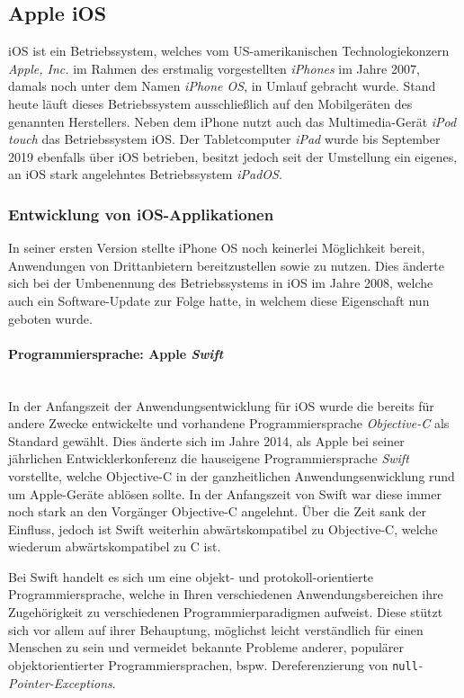

\subsection{Apple iOS} \label{chap:apple_ios}

iOS ist ein Betriebssystem, welches vom US-amerikanischen Technologiekonzern \textit{Apple, Inc.} im Rahmen des erstmalig vorgestellten \textit{iPhones} im Jahre 2007, damals noch unter dem Namen \textit{iPhone OS}, in Umlauf gebracht wurde. Stand heute läuft dieses Betriebssystem ausschließlich auf den Mobilgeräten des genannten Herstellers. Neben dem iPhone nutzt auch das Multimedia-Gerät \textit{iPod touch} das Betriebssystem iOS. Der Tabletcomputer \textit{iPad} wurde bis September 2019 ebenfalls über iOS betrieben, besitzt jedoch seit der Umstellung ein eigenes, an iOS stark angelehntes Betriebssystem \textit{iPadOS}.

\subsubsection{Entwicklung von iOS-Applikationen}

In seiner ersten Version stellte iPhone OS noch keinerlei Möglichkeit bereit, Anwendungen von Drittanbietern bereitzustellen sowie zu nutzen. Dies änderte sich bei der Umbenennung des Betriebssystems in iOS im Jahre 2008, welche auch ein Software-Update zur Folge hatte, in welchem diese Eigenschaft nun geboten wurde.

\paragraph{Programmiersprache: Apple \textit{Swift}}\mbox{}\\
In der Anfangszeit der Anwendungsentwicklung für iOS wurde die bereits für andere Zwecke entwickelte und vorhandene Programmiersprache \textit{Objective-C} als Standard gewählt. Dies änderte sich im Jahre 2014, als Apple bei seiner jährlichen Entwicklerkonferenz die hauseigene Programmiersprache \textit{Swift} vorstellte, welche Objective-C in der ganzheitlichen Anwendungsenwicklung rund um Apple-Geräte ablösen sollte. In der Anfangszeit von Swift war diese immer noch stark an den Vorgänger Objective-C angelehnt. Über die Zeit sank der Einfluss, jedoch ist Swift weiterhin abwärtskompatibel zu Objective-C, welche wiederum abwärtskompatibel zu C ist.

Bei Swift handelt es sich um eine objekt- und protokoll-orientierte Programmiersprache, welche in Ihren verschiedenen Anwendungsbereichen ihre Zugehörigkeit zu verschiedenen Programmierparadigmen aufweist. Diese stützt sich vor allem auf ihrer Behauptung, möglichst leicht verständlich für einen Menschen zu sein und vermeidet bekannte Probleme anderer, populärer objektorientierter Programmiersprachen, bspw. Dereferenzierung von \texttt{null}\textit{-Pointer-Exceptions}.

